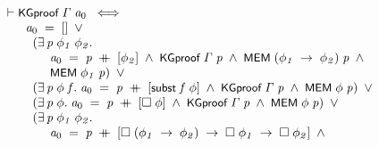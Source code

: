 \documentclass{report}
\renewcommand{\HOLConst}[1]{{\textsf{\upshape\small #1}}}
\newenvironment{holmath}{\begin{displaymath}\begin{array}{l}}{\end{array}\end{displaymath}\ignorespacesafterend}
\begin{document}
\begin{holmath}
  \ensuremath{\HOLTokenTurnstile}\HOLConst{KGproof}\;\HOLFreeVar{\ensuremath{\Gamma}}\;\HOLFreeVar{a\sb{\mathrm{0}}}\;\HOLSymConst{\HOLTokenEquiv{}}\\
\;\;\;\;\;\;\;\HOLFreeVar{a\sb{\mathrm{0}}}\;\HOLSymConst{=}\;[]\;\HOLSymConst{\HOLTokenDisj{}}\\
\;\;\;\;\;\;\;\;\;(\HOLSymConst{\HOLTokenExists{}}\HOLBoundVar{p}\;\HOLBoundVar{\ensuremath{\phi\sb{1}}}\;\HOLBoundVar{\ensuremath{\phi\sb{2}}}.\\
\;\;\;\;\;\;\;\;\;\;\;\;\;\;\HOLFreeVar{a\sb{\mathrm{0}}}\;\HOLSymConst{=}\;\HOLBoundVar{p}\;\HOLSymConst{\HOLTokenDoublePlus}\;[\HOLBoundVar{\ensuremath{\phi\sb{2}}}]\;\HOLSymConst{\HOLTokenConj{}}\;\HOLConst{KGproof}\;\HOLFreeVar{\ensuremath{\Gamma}}\;\HOLBoundVar{p}\;\HOLSymConst{\HOLTokenConj{}}\;\HOLConst{MEM}\;(\HOLBoundVar{\ensuremath{\phi\sb{1}}}\;\HOLSymConst{\ensuremath{\rightarrow}}\;\HOLBoundVar{\ensuremath{\phi\sb{2}}})\;\HOLBoundVar{p}\;\HOLSymConst{\HOLTokenConj{}}\\
\;\;\;\;\;\;\;\;\;\;\;\;\;\;\HOLConst{MEM}\;\HOLBoundVar{\ensuremath{\phi\sb{1}}}\;\HOLBoundVar{p})\;\HOLSymConst{\HOLTokenDisj{}}\\
\;\;\;\;\;\;\;\;\;(\HOLSymConst{\HOLTokenExists{}}\HOLBoundVar{p}\;\HOLBoundVar{\ensuremath{\phi}}\;\HOLBoundVar{f}.\;\HOLFreeVar{a\sb{\mathrm{0}}}\;\HOLSymConst{=}\;\HOLBoundVar{p}\;\HOLSymConst{\HOLTokenDoublePlus}\;[\HOLConst{subst}\;\HOLBoundVar{f}\;\HOLBoundVar{\ensuremath{\phi}}]\;\HOLSymConst{\HOLTokenConj{}}\;\HOLConst{KGproof}\;\HOLFreeVar{\ensuremath{\Gamma}}\;\HOLBoundVar{p}\;\HOLSymConst{\HOLTokenConj{}}\;\HOLConst{MEM}\;\HOLBoundVar{\ensuremath{\phi}}\;\HOLBoundVar{p})\;\HOLSymConst{\HOLTokenDisj{}}\\
\;\;\;\;\;\;\;\;\;(\HOLSymConst{\HOLTokenExists{}}\HOLBoundVar{p}\;\HOLBoundVar{\ensuremath{\phi}}.\;\HOLFreeVar{a\sb{\mathrm{0}}}\;\HOLSymConst{=}\;\HOLBoundVar{p}\;\HOLSymConst{\HOLTokenDoublePlus}\;[\HOLSymConst{\ensuremath{\Box}}\;\HOLBoundVar{\ensuremath{\phi}}]\;\HOLSymConst{\HOLTokenConj{}}\;\HOLConst{KGproof}\;\HOLFreeVar{\ensuremath{\Gamma}}\;\HOLBoundVar{p}\;\HOLSymConst{\HOLTokenConj{}}\;\HOLConst{MEM}\;\HOLBoundVar{\ensuremath{\phi}}\;\HOLBoundVar{p})\;\HOLSymConst{\HOLTokenDisj{}}\\
\;\;\;\;\;\;\;\;\;(\HOLSymConst{\HOLTokenExists{}}\HOLBoundVar{p}\;\HOLBoundVar{\ensuremath{\phi\sb{1}}}\;\HOLBoundVar{\ensuremath{\phi\sb{2}}}.\\
\;\;\;\;\;\;\;\;\;\;\;\;\;\;\HOLFreeVar{a\sb{\mathrm{0}}}\;\HOLSymConst{=}\;\HOLBoundVar{p}\;\HOLSymConst{\HOLTokenDoublePlus}\;[\HOLSymConst{\ensuremath{\Box}}\;(\HOLBoundVar{\ensuremath{\phi\sb{1}}}\;\HOLSymConst{\ensuremath{\rightarrow}}\;\HOLBoundVar{\ensuremath{\phi\sb{2}}})\;\HOLSymConst{\ensuremath{\rightarrow}}\;\HOLSymConst{\ensuremath{\Box}}\;\HOLBoundVar{\ensuremath{\phi\sb{1}}}\;\HOLSymConst{\ensuremath{\rightarrow}}\;\HOLSymConst{\ensuremath{\Box}}\;\HOLBoundVar{\ensuremath{\phi\sb{2}}}]\;\HOLSymConst{\HOLTokenConj{}}\\

\end{holmath}
\end{document}

